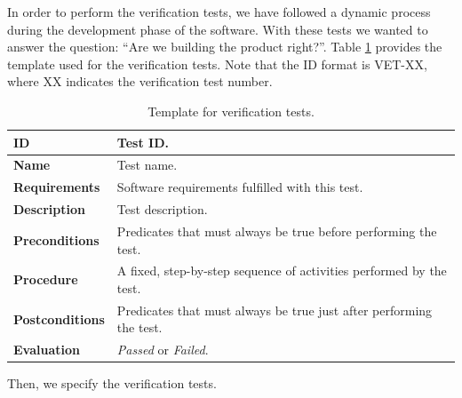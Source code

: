 In order to perform the verification tests, we have followed a dynamic process during the development phase of the software. With these tests we wanted to answer the question: ``Are we building the product right?''. Table \ref{tab:verification_tests} provides the template used for the verification tests. Note that the ID format is VET-XX, where XX indicates the verification test number.

\clearpage

\begin{center}
\begin{table}[htb]
\centering
\begin{tabular}{@{}p{2.5cm} p{9cm}@{}} 
\toprule
\textbf{ID} 					& Test ID. \\
\midrule
\textbf{Name} 				& Test name. \\
\midrule
\textbf{Requirements} 		& Software requirements fulfilled with this test. \\
\midrule
\textbf{Description} 		& Test description. \\
\midrule
\textbf{Preconditions}		& Predicates that must always be true before performing the test. \\
\midrule
\textbf{Procedure}			& A fixed, step-by-step sequence of activities performed by the test. \\
\midrule
\textbf{Postconditions} 		& Predicates that must always be true just after performing the test. \\
\midrule
\textbf{Evaluation} 			& \textit{Passed} or \textit{Failed}. \\
\bottomrule
\end{tabular}
\caption{Template for verification tests.}
\label{tab:verification_tests}
\end{table}
\end{center}

Then, we specify the verification tests.

\vspace{0.7cm}

